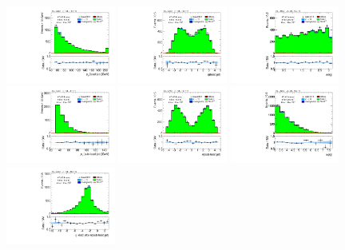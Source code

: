 \begin{figure}[tp]
  \includegraphics[width=0.32\textwidth]{figures/analysis/vbf-QCDCR/jet-1-pt}
  \includegraphics[width=0.32\textwidth]{figures/analysis/vbf-QCDCR/jet-1-eta}
  \includegraphics[width=0.32\textwidth]{figures/analysis/vbf-QCDCR/jets-dphi}
  \includegraphics[width=0.32\textwidth]{figures/analysis/vbf-QCDCR/jet-2-pt}
  \includegraphics[width=0.32\textwidth]{figures/analysis/vbf-QCDCR/jet-2-eta}
  \includegraphics[width=0.32\textwidth]{figures/analysis/vbf-QCDCR/jets-deta}
  \includegraphics[width=0.32\textwidth]{figures/analysis/vbf-QCDCR/jets-etaprod}

\end{figure}
